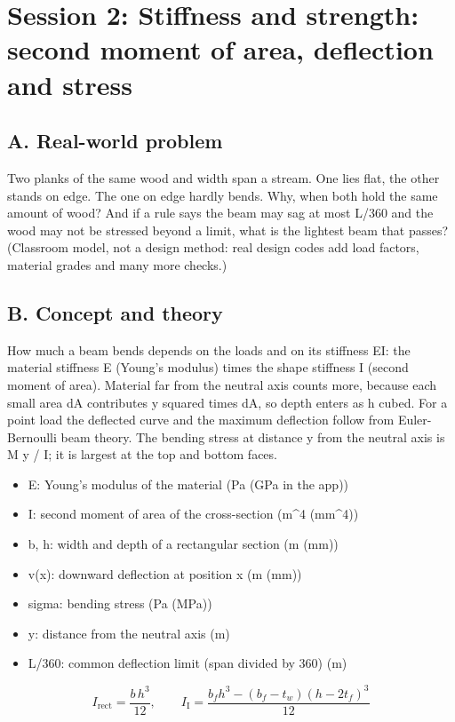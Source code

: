 \documentclass[11pt,a4paper]{article}
\begin{document}
\section{Session 2: Stiffness and strength: second moment of area, deflection and stress}

\subsection*{A. Real-world problem}
Two planks of the same wood and width span a stream. One lies flat, the other stands on edge. The one on edge hardly bends. Why, when both hold the same amount of wood? And if a rule says the beam may sag at most L/360 and the wood may not be stressed beyond a limit, what is the lightest beam that passes? (Classroom model, not a design method: real design codes add load factors, material grades and many more checks.)

\subsection*{B. Concept and theory}
How much a beam bends depends on the loads and on its stiffness EI: the material stiffness E (Young's modulus) times the shape stiffness I (second moment of area). Material far from the neutral axis counts more, because each small area dA contributes y squared times dA, so depth enters as h cubed. For a point load the deflected curve and the maximum deflection follow from Euler-Bernoulli beam theory. The bending stress at distance y from the neutral axis is M y / I; it is largest at the top and bottom faces.

\begin{itemize}[nosep]
\item E: Young's modulus of the material (Pa (GPa in the app))
\item I: second moment of area of the cross-section (m\textasciicircum{}4 (mm\textasciicircum{}4))
\item b, h: width and depth of a rectangular section (m (mm))
\item v(x): downward deflection at position x (m (mm))
\item sigma: bending stress (Pa (MPa))
\item y: distance from the neutral axis (m)
\item L/360: common deflection limit (span divided by 360) (m)
\end{itemize}

\begin{equation*}
I_{\mathrm{rect}}=\frac{b\,h^{3}}{12},\qquad I_{\mathrm{I}}=\frac{b_f h^{3}-(b_f-t_w)(h-2t_f)^{3}}{12}
\end{equation*}
\end{document}
